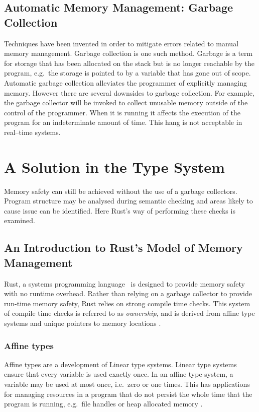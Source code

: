 \subsection{Automatic Memory Management: Garbage Collection}
Techniques have been invented in order to mitigate errors related to manual
memory management. Garbage collection is one such method.  Garbage is a term
for storage that has been allocated on the stack but is no longer reachable by
the program, e.g.\ the storage is pointed to by a variable that has gone out of
scope. Automatic garbage collection alleviates the programmer of explicitly
managing memory. However there are several downsides to garbage collection. For
example, the garbage collector will be invoked to collect unusable memory
outside of the control of the programmer. When it is running it affects the
execution of the program for an indeterminate amount of time. This hang is not
acceptable in real--time systems.

\section{A Solution in the Type System}
Memory safety can still be achieved without the use of a garbage collectors.
Program structure may be analysed during semantic checking and areas likely to
cause issue can be identified. Here Rust's way of performing these checks is
examined.

\subsection{An Introduction to Rust's Model of Memory Management}
Rust, a systems programming language~\cite{rust} is designed to provide memory
safety with no runtime overhead. Rather than relying on a garbage collector to
provide run-time memory safety, Rust relies on strong compile time checks.
This system of compile time checks is referred to as \textit{ownership}, and is
derived from affine type systems and unique pointers to memory
locations\cite{rust-borrowing} \cite{levy2015ownership}.

\subsubsection{Affine types}
Affine types are a development of Linear type systems. Linear type systems
ensure that every variable is used exactly once. In an affine type system, a
variable may be used at most once, i.e.\ zero or one times. This has applications
for managing resources in a program that do not persist the whole time that the
program is running, e.g.\ file handles or heap allocated memory \cite{attapl}
\cite{tovAffine}.

